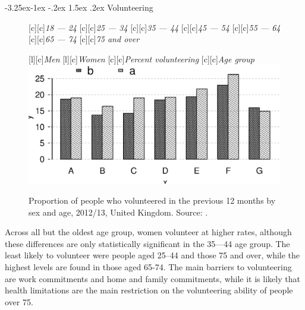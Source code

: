 \documentclass[11 pt, a4paper]{report}
\makeatletter
\renewcommand\subsection{\@startsection{subsection}{2}{\z@}%
                                     {-3.25ex\@plus -1ex \@minus -.2ex}%
                                     {1.5ex \@plus .2ex}%
    								{\large\scshape}}
\makeatother
\begin{document}
\subsection{Volunteering}

\begin{figure}[hbtp!]


[c][c]{\small{\emph{18 --- 24}}}
[c][c]{\small{\emph{25 --- 34}}}
[c][c]{\small{\emph{35 --- 44}}}
[c][c]{\small{\emph{45 --- 54}}}
[c][c]{\small{\emph{55 --- 64}}}
[c][c]{\small{\emph{65 --- 74}}}
[c][c]{\small{\emph{75 and over}}}

[l][c]{\small{\emph{Men}}}
[l][c]{\small{\emph{Women}}}
[c][c]{\small{\emph{Percent volunteering}}}
[c][c]{\small{\emph{Age group}}}
\includegraphics[width=\textwidth]{../figures/Fig9.1.eps}
\caption{Proportion of people who volunteered in the previous 12 months by sex and age, 2012/13, United Kingdom. Source: \citet{Sieg2015}.}\label{Fig:93} %
\end{figure}

Across all but the oldest age group, women volunteer at higher rates, although these differences are only statistically significant in the 35---44 age group. The least likely to volunteer were people aged 25--44 and those 75 and over, while the highest levels are found in those aged 65-74. The main barriers to volunteering are work commitments and home and family commitments, while it is likely that health limitations are the main restriction on the volunteering ability of people over 75. 
\end{document}
